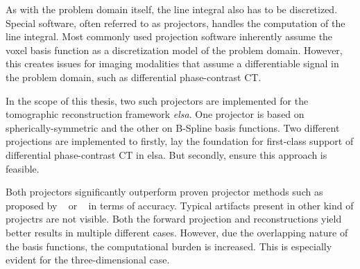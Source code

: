As with the problem domain itself, the line integral also has to be discretized. Special software,
often referred to as projectors, handles the computation of the line integral. Most commonly used
projection software inherently assume the voxel basis function as a discretization model of the
problem domain. However, this creates issues for imaging modalities that assume a differentiable
signal in the problem domain, such as differential phase-contrast CT\@.

In the scope of this thesis, two such projectors are implemented for the tomographic reconstruction
framework \textit{elsa}. One projector is based on spherically-symmetric and the other on B-Spline
basis functions. Two different projections are implemented to firstly, lay the foundation for
first-class support of differential phase-contrast CT in elsa. But secondly, ensure this approach is
feasible.

Both projectors significantly outperform proven projector methods such as proposed by
\citeauthor*{siddon_fast_1985}~\cite{siddon_fast_1985} or
\citeauthor*{joseph_improved_1982}~\cite{joseph_improved_1982} in terms of accuracy. Typical
artifacts present in other kind of projectrs are not visible. Both the forward projection and
reconstructions yield better results in multiple different cases. However, due the overlapping
nature of the basis functions, the computational burden is increased. This is especially evident for
the three-dimensional case.
